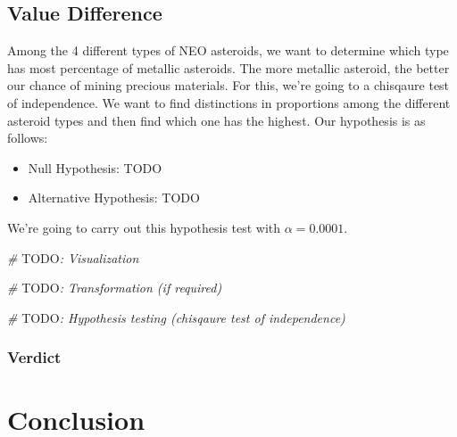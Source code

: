 \documentclass[
]{article}
\newenvironment{Shaded}{\begin{snugshade}}{\end{snugshade}}
\newcommand{\AlertTok}[1]{\textcolor[rgb]{0.94,0.16,0.16}{#1}}
\newcommand{\CommentTok}[1]{\textcolor[rgb]{0.56,0.35,0.01}{\textit{#1}}}
\begin{document}
\hypertarget{value-difference}{%
\subsection{Value Difference}\label{value-difference}}

Among the 4 different types of NEO asteroids, we want to determine which
type has most percentage of metallic asteroids. The more metallic
asteroid, the better our chance of mining precious materials. For this,
we're going to a chisqaure test of independence. We want to find
distinctions in proportions among the different asteroid types and then
find which one has the highest. Our hypothesis is as follows:

\begin{itemize}
\item
  Null Hypothesis: TODO
\item
  Alternative Hypothesis: TODO
\end{itemize}

We're going to carry out this hypothesis test with \(\alpha = 0.0001\).

\begin{Shaded}
\begin{Highlighting}[]
\CommentTok{\# }\AlertTok{TODO}\CommentTok{: Visualization}
\end{Highlighting}
\end{Shaded}

\begin{Shaded}
\begin{Highlighting}[]
\CommentTok{\# }\AlertTok{TODO}\CommentTok{: Transformation (if required)}
\end{Highlighting}
\end{Shaded}

\begin{Shaded}
\begin{Highlighting}[]
\CommentTok{\# }\AlertTok{TODO}\CommentTok{: Hypothesis testing (chisqaure test of independence)}
\end{Highlighting}
\end{Shaded}

\hypertarget{verdict-4}{%
\subsubsection{Verdict}\label{verdict-4}}

\hypertarget{conclusion}{%
\section{Conclusion}\label{conclusion}}
\end{document}

